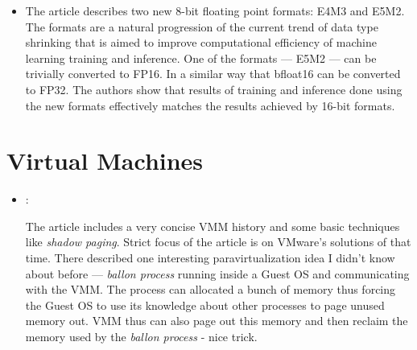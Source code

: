\begin{itemize}
    \item \cite{Micikevicius:FP8ForDL:2022}

    The article describes two new 8-bit floating point formats: E4M3 and E5M2. The formats are a natural progression of the current trend of data type shrinking that is aimed to improve computational efficiency of machine learning training and inference. One of the formats --- E5M2 --- can be trivially converted to FP16. In a similar way that bfloat16 can be converted to FP32. The authors show that results of training and inference done using the new formats effectively matches the results achieved by 16-bit formats.
\end{itemize}

\section*{Virtual Machines}
\begin{itemize}
    \item \cite{Rosenblum:VMM-trends:2005}:

    The article includes a very concise VMM history and some basic techniques like \textit{shadow paging}. Strict focus of the article is on VMware's solutions of that time. There described one interesting paravirtualization idea I didn't know about before --- \textit{ballon process} running inside a Guest OS and communicating with the VMM. The process can allocated a bunch of memory thus forcing the Guest OS to use its knowledge about other processes to page unused memory out. VMM thus can also page out this memory and then reclaim the memory used by the \textit{ballon process} - nice trick.
\end{itemize}

